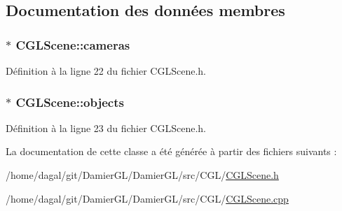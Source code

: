 \subsection{Documentation des données membres}
\hypertarget{class_c_g_l_scene_aa57c4220c940450c378279aaf35ef336}{
\subsubsection[{cameras}]{$\ast$ C\-G\-L\-Scene\-::cameras\hspace{0.3cm}{\ttfamily [protected]}}}\label{class_c_g_l_scene_aa57c4220c940450c378279aaf35ef336}


Définition à la ligne 22 du fichier C\-G\-L\-Scene.\-h.

\hypertarget{class_c_g_l_scene_a4663f82695310eb9bee34ecc1c74c886}{
\subsubsection[{objects}]{$\ast$ C\-G\-L\-Scene\-::objects\hspace{0.3cm}{\ttfamily [protected]}}}\label{class_c_g_l_scene_a4663f82695310eb9bee34ecc1c74c886}


Définition à la ligne 23 du fichier C\-G\-L\-Scene.\-h.



La documentation de cette classe a été générée à partir des fichiers suivants \-:\begin{DoxyCompactItemize}
\item 
/home/dagal/git/\-Damier\-G\-L/\-Damier\-G\-L/src/\-C\-G\-L/\hyperlink{_c_g_l_scene_8h}{C\-G\-L\-Scene.\-h}\item 
/home/dagal/git/\-Damier\-G\-L/\-Damier\-G\-L/src/\-C\-G\-L/\hyperlink{_c_g_l_scene_8cpp}{C\-G\-L\-Scene.\-cpp}\end{DoxyCompactItemize}

